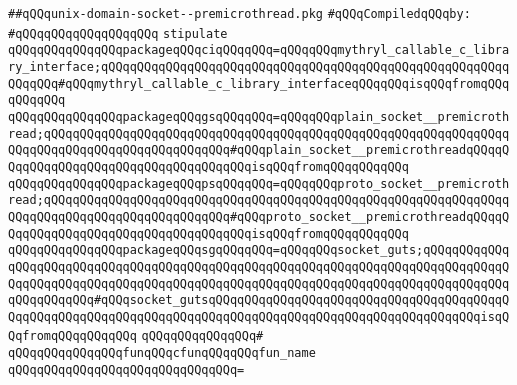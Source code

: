 \label{src/lib/std/src/socket/unix-domain-socket--premicrothread.pkg}
\verb|##qQQqunix-domain-socket--premicrothread.pkg|\newline
\newline
\verb|#qQQqCompiledqQQqby:|\newline
\verb|#qQQqqQQqqQQqqQQqqQQq|\newline
\newline
\verb|stipulate|\newline
\verb|qQQqqQQqqQQqqQQqpackageqQQqciqQQqqQQq=qQQqqQQqmythryl_callable_c_library_interface;qQQqqQQqqQQqqQQqqQQqqQQqqQQqqQQqqQQqqQQqqQQqqQQqqQQqqQQqqQQqqQQq#qQQqmythryl_callable_c_library_interfaceqQQqqQQqisqQQqfromqQQqqQQqqQQq|\newline
\verb|qQQqqQQqqQQqqQQqpackageqQQqgsqQQqqQQq=qQQqqQQqplain_socket__premicrothread;qQQqqQQqqQQqqQQqqQQqqQQqqQQqqQQqqQQqqQQqqQQqqQQqqQQqqQQqqQQqqQQqqQQqqQQqqQQqqQQqqQQqqQQqqQQqqQQq#qQQqplain_socket__premicrothreadqQQqqQQqqQQqqQQqqQQqqQQqqQQqqQQqqQQqqQQqisqQQqfromqQQqqQQqqQQq|\newline
\verb|qQQqqQQqqQQqqQQqpackageqQQqpsqQQqqQQq=qQQqqQQqproto_socket__premicrothread;qQQqqQQqqQQqqQQqqQQqqQQqqQQqqQQqqQQqqQQqqQQqqQQqqQQqqQQqqQQqqQQqqQQqqQQqqQQqqQQqqQQqqQQqqQQqqQQq#qQQqproto_socket__premicrothreadqQQqqQQqqQQqqQQqqQQqqQQqqQQqqQQqqQQqqQQqisqQQqfromqQQqqQQqqQQq|\newline
\verb|qQQqqQQqqQQqqQQqpackageqQQqsgqQQqqQQq=qQQqqQQqsocket_guts;qQQqqQQqqQQqqQQqqQQqqQQqqQQqqQQqqQQqqQQqqQQqqQQqqQQqqQQqqQQqqQQqqQQqqQQqqQQqqQQqqQQqqQQqqQQqqQQqqQQqqQQqqQQqqQQqqQQqqQQqqQQqqQQqqQQqqQQqqQQqqQQqqQQqqQQqqQQqqQQqqQQq#qQQqsocket_gutsqQQqqQQqqQQqqQQqqQQqqQQqqQQqqQQqqQQqqQQqqQQqqQQqqQQqqQQqqQQqqQQqqQQqqQQqqQQqqQQqqQQqqQQqqQQqqQQqqQQqqQQqqQQqisqQQqfromqQQqqQQqqQQq|\newline
\verb|qQQqqQQqqQQqqQQq#|\newline
\verb|qQQqqQQqqQQqqQQqfunqQQqcfunqQQqqQQqfun_name|\newline
\verb|qQQqqQQqqQQqqQQqqQQqqQQqqQQqqQQq=|\newline
